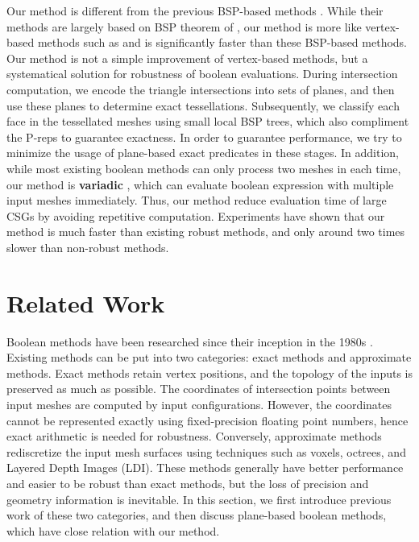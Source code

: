 Our method is different from the previous BSP-based methods \cite{bernstein2009fast,campen2010exact}.
While their methods are largely based on BSP theorem of \cite{naylor1990merging,thibault1987set}, our method is more like vertex-based methods such as \cite{feito2013fast,zhou2016mesh} and is significantly faster than these BSP-based methods. Our method is not a simple improvement of vertex-based methods, but a systematical solution for robustness of boolean evaluations. During intersection computation, we encode the triangle intersections into sets of planes, and then use these planes to determine exact tessellations. Subsequently, we classify each face in the tessellated meshes using small local BSP trees, which also compliment the P-reps to guarantee exactness. In order to guarantee performance, we try to minimize the usage of plane-based exact predicates in these stages. In addition, while most existing boolean methods can only process two meshes in each time, our method is \textbf{variadic} \cite{zhou2016mesh}, which can evaluate boolean expression with multiple input meshes immediately. Thus, our method reduce evaluation time of large CSGs by avoiding repetitive computation. Experiments have shown that our method is much faster than existing robust methods, and only around two times slower than non-robust methods.

\section{Related Work}


Boolean methods have been researched since their inception in the 1980s \cite{requicha1985boolean, laidlaw1986constructive}. Existing methods can be put into two categories: exact methods and approximate methods. Exact methods retain vertex positions, and the topology of the inputs is preserved as much as possible. The coordinates of intersection points between input meshes are computed by input configurations. However, the coordinates cannot be represented exactly using fixed-precision floating point numbers, hence exact arithmetic is needed for robustness. Conversely, approximate methods rediscretize the input mesh surfaces using techniques such as voxels, octrees, and Layered Depth Images (LDI). These methods generally have better performance and easier to be robust than exact methods, but the loss of precision and geometry information is inevitable. In this section, we first introduce previous work of these two categories, and then discuss plane-based boolean methods, which have close relation with our method.

